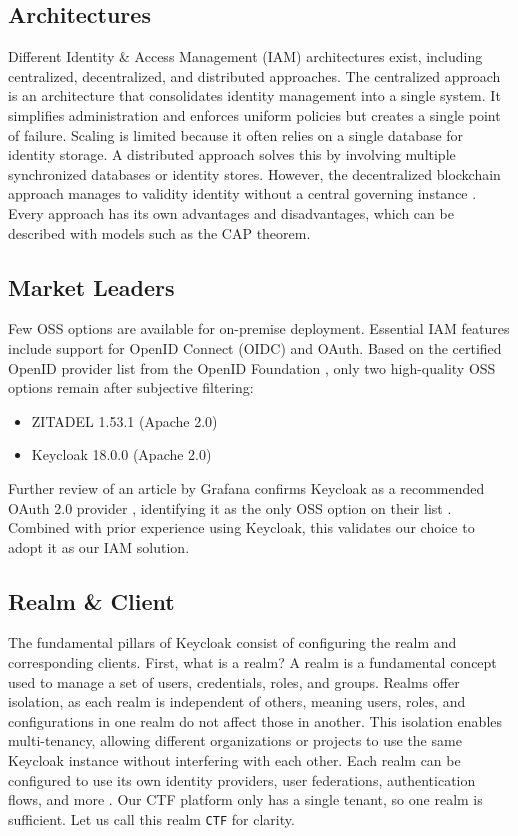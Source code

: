 \subsection{Architectures}
Different Identity \& Access Management (IAM) architectures exist, including centralized, decentralized, and distributed approaches. The centralized approach is an architecture that consolidates identity management into a single system. It simplifies administration and enforces uniform policies but creates a single point of failure. Scaling is limited because it often relies on a single database for identity storage. A distributed approach solves this by involving multiple synchronized databases or identity stores. However, the decentralized blockchain approach manages to validity identity without a central governing instance \Parencite{geeksforgeeks2025}. Every approach has its own advantages and disadvantages, which can be described with models such as the CAP theorem. 

\subsection{Market Leaders}
Few OSS options are available for on-premise deployment. Essential IAM features include support for OpenID Connect (OIDC) and OAuth. Based on the certified OpenID provider list from the OpenID Foundation \parencite{openidImplementations}, only two high-quality OSS options remain after subjective filtering:

\begin{itemize}
    \item ZITADEL 1.53.1 (Apache 2.0)
    \item Keycloak 18.0.0 (Apache 2.0)
\end{itemize}

Further review of an article by Grafana confirms Keycloak as a recommended OAuth 2.0 provider \parencite{keycloak}, identifying it as the only OSS option on their list \parencite{grafana_oauth}. Combined with prior experience using Keycloak, this validates our choice to adopt it as our IAM solution.

\subsection{Realm \& Client}
The fundamental pillars of Keycloak consist of configuring the realm and corresponding clients. First, what is a realm? A realm is a fundamental concept used to manage a set of users, credentials, roles, and groups. Realms offer isolation, as each realm is independent of others, meaning users, roles, and configurations in one realm do not affect those in another. This isolation enables multi-tenancy, allowing different organizations or projects to use the same Keycloak instance without interfering with each other. Each realm can be configured to use its own identity providers, user federations, authentication flows, and more \Parencite{keycloakDocs}. Our CTF platform only has a single tenant, so one realm is sufficient. Let us call this realm \texttt{CTF} for clarity.

